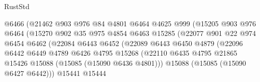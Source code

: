 \begin{lexlean}{RustStd}
\begin{coremodule}
                                    @6466
                                    (@21462
                                      @903
                                      @976
                                      @84
                                      @4801
                                      @6464
                                      @4625
                                      @999
                                      (@15205
                                        @903
                                        @976
                                        @6464
                                        (@15270
                                          @902
                                          @35
                                          @975
                                          @4854
                                          @6463
                                          @15285
                                          (@22077
                                            @901
                                            @22
                                            @974
                                            @6454
                                            @6462
                                            (@22084
                                              @6443
                                              @6452
                                              (@22089
                                                @6443
                                                @6450
                                                @4879
                                                (@22096
                                                  @6442
                                                  @6449
                                                  @4789
                                                  @6426
                                                  @4795
                                                  @15268
                                                  (@22110
                                                    @6435
                                                    @4795
                                                    @21865
                                                    @15426
                                                    @15088
                                                    (@15085 (@15090 @6436 @4801)))
                                                  @15088
                                                  (@15085 (@15090 @6427 @6442)))
                                                @15441
                                                @15444

\end{coremodule}
\end{lexlean}
